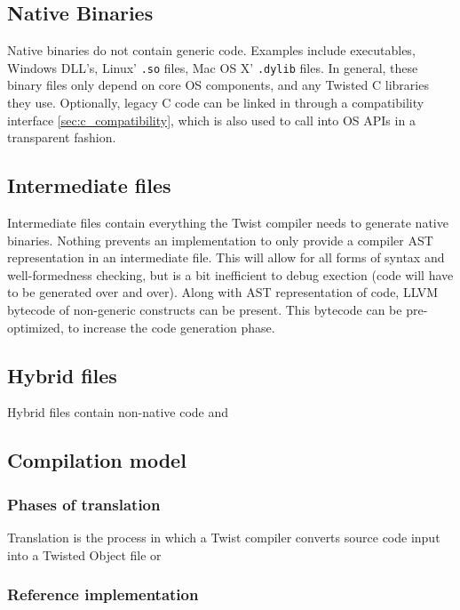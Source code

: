\documentclass[a4paper,11pt]{report}
\newcommand{\tcode}[1]{\texttt{#1}}
\begin{document}
  \subsection{Native Binaries}

Native binaries do not contain generic code.
Examples include executables, Windows DLL's, Linux' \tcode{.so} files, Mac OS X' \tcode{.dylib} files.
In general, these binary files only depend on core OS components, and any Twisted C libraries they use.
Optionally, legacy C code can be linked in through a compatibility interface \ref{sec:c_compatibility}, which is also used to call into OS APIs in a transparent fashion.

  \subsection{Intermediate files}

Intermediate files contain everything the Twist compiler needs to generate native binaries.
Nothing prevents an implementation to only provide a compiler AST representation in an intermediate file.
This will allow for all forms of syntax and well-formedness checking, but is a bit inefficient to debug exection (code will have to be generated over and over).
Along with AST representation of code, LLVM bytecode of non-generic constructs can be present.
This bytecode can be pre-optimized, to increase the code generation phase. 

  \subsection{Hybrid files}

Hybrid files contain non-native code and 

  \subsection{Compilation model}
    \subsubsection{Phases of translation}

Translation is the process in which a Twist compiler converts source code input into a Twisted Object file or 

    \subsubsection{Reference implementation}
\end{document}
